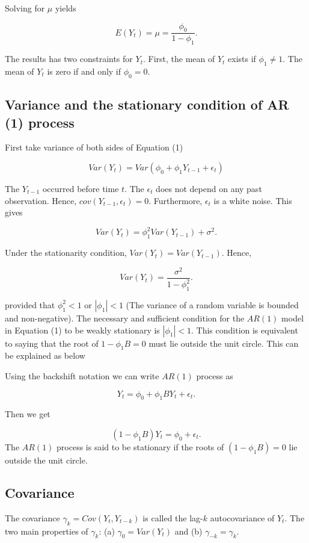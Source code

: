 \documentclass[
  11pt,
  a4paper,
]{report}
\begin{document}
Solving for \(\mu\) yields

\begin{equation}
E(Y_t)=\mu=\frac{\phi_0}{1-\phi_1}.
\end{equation}

The results has two constraints for \(Y_t\). First, the mean of \(Y_t\)
exists if \(\phi_1 \neq 1 .\) The mean of \(Y_t\) is zero if and only if
\(\phi_0=0\).

\subsection{Variance and the stationary condition of AR (1)
process}\label{variance-and-the-stationary-condition-of-ar-1-process}

First take variance of both sides of Equation (1)

\[Var(Y_t)=Var(\phi_0+\phi_1 Y_{t-1}+\epsilon_t)\]

The \(Y_{t-1}\) occurred before time \(t\). The \(\epsilon_t\) does not
depend on any past observation. Hence, \(cov(Y_{t-1}, \epsilon_t)= 0\).
Furthermore, \({\epsilon_t}\) is a white noise. This gives

\[Var(Y_t)=\phi_1^2 Var(Y_{t-1})+\sigma^2.\]

Under the stationarity condition, \(Var(Y_t)=Var(Y_{t-1})\). Hence,

\[Var(Y_t)=\frac{\sigma^2}{1-\phi_1^2}.\]

provided that \(\phi_1^2 < 1\) or \(|\phi_1| < 1\) (The variance of a
random variable is bounded and non-negative). The necessary and
sufficient condition for the \(AR(1)\) model in Equation (1) to be
weakly stationary is \(|\phi_1| < 1\). This condition is equivalent to
saying that the root of \(1-\phi_1B = 0\) must lie outside the unit
circle. This can be explained as below

Using the backshift notation we can write \(AR(1)\) process as

\[Y_t = \phi_0 + \phi_1BY_{t} + \epsilon_t.\]

Then we get

\[(1-\phi_1B)Y_t=\phi_0 + \epsilon_t.\] The \(AR(1)\) process is said to
be stationary if the roots of \((1-\phi_1B)=0\) lie outside the unit
circle.

\subsection{Covariance}\label{covariance}

The covariance \(\gamma_k=Cov(Y_t, Y_{t-k})\) is called the lag-\(k\)
autocovariance of \(Y_t\). The two main properties of \(\gamma_k\): (a)
\(\gamma_0=Var(Y_t)\) and (b) \(\gamma_{-k}=\gamma_{k}\).
\end{document}

